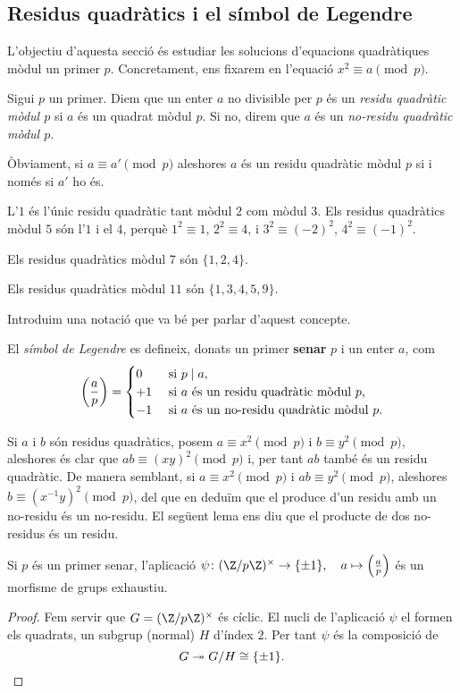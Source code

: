 \subsection{Residus quadràtics i el símbol de Legendre}

L'objectiu d'aquesta secció és estudiar les solucions d'equacions quadràtiques mòdul un primer $p$. Concretament, ens fixarem en l'equació $x^2\equiv a\pmod{p}$.

\begin{definition}
 Sigui $p$ un primer. Diem que un enter $a$ no divisible per $p$ és un \emph{residu quadràtic mòdul $p$} si $a$ és un quadrat mòdul $p$. Si no, direm que $a$ és un \emph{no-residu quadràtic mòdul $p$}.
\end{definition}

Òbviament, si $a\equiv a'\pmod{p}$ aleshores $a$ és un residu quadràtic mòdul $p$ si i només si $a'$ ho és.

\begin{example}
L'$1$ és l'únic residu quadràtic tant mòdul $2$ com mòdul $3$.
Els residus quadràtics mòdul $5$ són l'$1$ i el $4$, perquè $1^2\equiv 1$, $2^2\equiv 4$, i $3^2\equiv (-2)^2$, $4^2 \equiv (-1)^2$.

Els residus quadràtics mòdul $7$ són $\{1,2,4\}$.

Els residus quadràtics mòdul $11$ són $\{1,3,4,5,9\}$.
\end{example}

Introduim una notació que va bé per parlar d'aquest concepte.

\begin{definition}
El \emph{símbol de Legendre} es defineix, donats un primer \textbf{senar} $p$ i un enter $a$, com
\[
\left(\frac{a}{p}\right)=\begin{cases}
0 &\text{ si } p\mid a,\\
+1 &\text{ si $a$ és un residu quadràtic mòdul $p$,}\\
-1&\text{ si $a$ és un no-residu quadràtic mòdul $p$}.
\end{cases}
\]
\end{definition}

Si $a$ i $b$ són residus quadràtics, posem $a\equiv x^2\pmod p$ i $b\equiv y^2\pmod p$, aleshores és clar que $ab\equiv (xy)^2\pmod p$ i, per tant $ab$ també és un residu quadràtic. De manera semblant, si $a\equiv x^2\pmod p$ i $ab\equiv y^2\pmod p$, aleshores $b\equiv (x^{-1}y)^2\pmod p$, del que en deduïm que el produce d'un residu amb un no-residu és un no-residu. El següent lema ens diu que el producte de dos no-residus és un residu.
\begin{lemma}
Si $p$ és un primer senar, l'aplicació $\psi\colon (\Z/p\Z)^\times \to \{\pm 1\},\quad a\mapsto \legendre{a}{p}$ és un morfisme de grups exhaustiu.
\end{lemma}
\begin{proof}
Fem servir que $G = (\Z/p\Z)^\times$ és cíclic. El nucli de l'aplicació $\psi$ el formen els quadrats, un subgrup (normal) $H$ d'índex $2$. Per tant $\psi$ és la composició de
\[
G\twoheadrightarrow G/H \cong \{\pm 1\}.
\]
\end{proof}


